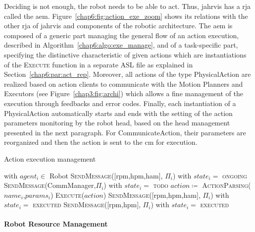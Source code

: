 \documentclass[a4paper,11pt,twoside]{StyleThese}
\begin{document}
Deciding is not enough, the robot needs to be able to act. Thus, \acrshort{jahrvis} has a \acrfull{rja} called the \acrfull{aem}. Figure~\ref{chap6:fig:action_exe_zoom} shows its relations with the other \acrshort{rja} of \acrshort{jahrvis} and components of the robotic architecture. The \acrshort{aem} is composed of a generic part managing the general flow of an action execution, described in Algorithm~\ref{chap6:algo:exe_manage}, and of a task-specific part, specifying the distinctive characteristic of given actions which are instantiations of the \textsc{Execute} function in a separate ASL file as explained in Section~\ref{chap6:par:act_rep}. Moreover, all actions of the type PhysicalAction are realized based on action clients to communicate with the Motion Planners and Executors (see Figure~\ref{chap3:fig:archi}) which allows a fine management of the execution through feedbacks and error codes. Finally, each instantiation of a PhysicalAction automatically starts and ends with the setting of the action parameters monitoring by the robot head, based on the head management presented in the next paragraph. For CommunicateAction, their parameters are reorganized and then the action is sent to the \acrshort{cm} for execution. 

\begin{algorithm}[!htb]
	\caption{Action execution management}
	\label{chap6:algo:exe_manage}
	\begin{algorithmic}
	 with $agent_i \in$ Robot
		\State \textsc{SendMessage}([\acrshort{rpm},\acrshort{hpm},\acrshort{ham}], $\Pi_i$) with $state_i=$ \textsc{ongoing}
		\State {}
		\State \textsc{SendMessage}(CommManager,$\Pi_i$) with $state_i=$ \textsc{todo}
	\EndIf
	\State $action \coloneqq$ \textsc{ActionParsing($name_i$,$params_i$)}
	\State \textsc{Execute($action$)}
		\State \textsc{SendMessage}([\acrshort{rpm},\acrshort{hpm},\acrshort{ham}], $\Pi_i$) with $state_i=$ \textsc{executed}
		\State \textsc{SendMessage}([\acrshort{rpm},\acrshort{hpm}], $\Pi_i$) with $state_i=$ \textsc{executed}
	\EndIf
	\EndFunction
	\end{algorithmic}
\end{algorithm}	



\paragraph{Robot Resource Management}\label{chap6:para:resource_m}
\end{document}
